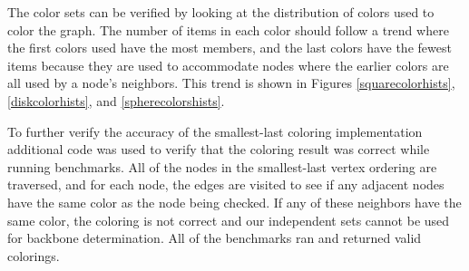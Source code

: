 \documentclass{article}
\begin{document}
        \par
        The color sets can be verified by looking at the distribution of colors used to color the graph. The number of items in each color should follow a trend where the first colors used have the most members, and the last colors have the fewest items because they are used to accommodate nodes where the earlier colors are all used by a node's neighbors. This trend is shown in Figures \ref{squarecolorhists}, \ref{diskcolorhists}, and \ref{spherecolorshists}.
        \par
        To further verify the accuracy of the smallest-last coloring implementation additional code was used to verify that the coloring result was correct while running benchmarks. All of the nodes in the smallest-last vertex ordering are traversed, and for each node, the edges are visited to see if any adjacent nodes have the same color as the node being checked. If any of these neighbors have the same color, the coloring is not correct and our independent sets cannot be used for backbone determination. All of the benchmarks ran and returned valid colorings.
\end{document}
